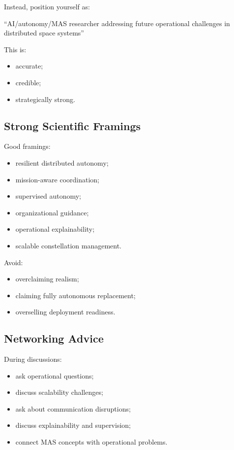 \documentclass[10pt,a4paper,twocolumn]{article}
\begin{document}
Instead, position yourself as:
\begin{center}
    ``AI/autonomy/MAS researcher addressing future operational challenges in distributed space systems''
\end{center}

This is:
\begin{itemize}
    \item accurate;
    \item credible;
    \item strategically strong.
\end{itemize}


\subsection{Strong Scientific Framings}

Good framings:
\begin{itemize}
    \item resilient distributed autonomy;
    \item mission-aware coordination;
    \item supervised autonomy;
    \item organizational guidance;
    \item operational explainability;
    \item scalable constellation management.
\end{itemize}

Avoid:
\begin{itemize}
    \item overclaiming realism;
    \item claiming fully autonomous replacement;
    \item overselling deployment readiness.
\end{itemize}


\subsection{Networking Advice}

During discussions:
\begin{itemize}
    \item ask operational questions;
    \item discuss scalability challenges;
    \item ask about communication disruptions;
    \item discuss explainability and supervision;
    \item connect MAS concepts with operational problems.
\end{itemize}
\end{document}
